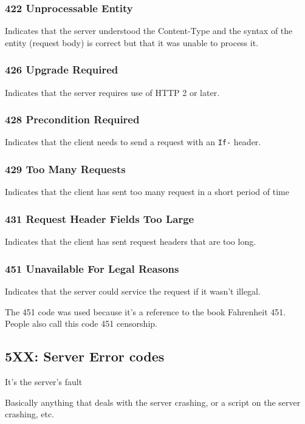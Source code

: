\documentclass[../CMPUT-404-Notes.tex]{subfiles}
\begin{document}
\subsubsection{422 Unprocessable Entity}
Indicates that the server understood the Content-Type and the syntax of the entity (request body) is correct but that it was unable to process it.

\subsubsection{426 Upgrade Required}
Indicates that the server requires use of HTTP 2 or later.

\subsubsection{428 Precondition Required}
Indicates that the client needs to send a request with an \texttt{If-} header.

\subsubsection{429 Too Many Requests}
Indicates that the client has sent too many request in a short period of time

\subsubsection{431 Request Header Fields Too Large}
Indicates that the client has sent request headers that are too long.

\subsubsection{451 Unavailable For Legal Reasons}
Indicates that the server could service the request if it wasn't illegal. 

\begin{Note}
  The 451 code was used because it's a reference to the book Fahrenheit 451. 
  People also call this code 451 censorship. 
\end{Note}

\subsection{5XX: Server Error codes}
\begin{DndReadAloud}[color=bgtan]
  It's the server's fault
\end{DndReadAloud}
Basically anything that deals with the server crashing, or a script on the server crashing, etc.
\end{document}
